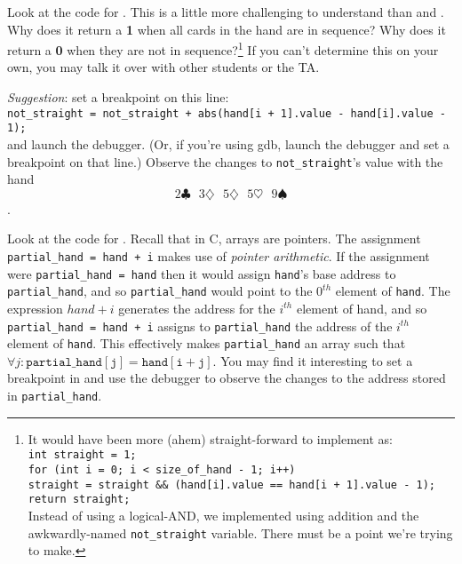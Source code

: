 Look at the code for .
This is a little more challenging to understand than  and .
Why does it return a \textbf{1} when all cards in the hand are in sequence?
Why does it return a \textbf{0} when they are not in sequence?\footnote{
    It would have been more (ahem) straight-forward to implement  as:
    \texttt{                                                                \\
    int straight = 1;                                                       \\
    for (int i = 0; i < size\_of\_hand - 1; i++)                            \\
        straight = straight \&\& (hand[i].value == hand[i + 1].value - 1);  \\
    return straight;                                                        \\
    }
    Instead of using a logical-AND, we implemented  using addition and the awkwardly-named \lstinline{not_straight} variable.
    There must be a point we're trying to make.
}
If you can't determine this on your own, you may talk it over with other students or the TA\@.

\textit{Suggestion}: set a breakpoint on this line: \\
\lstinline{not_straight = not_straight + abs(hand[i + 1].value - hand[i].value - 1);} \\
and launch the debugger.
(Or, if you're using gdb, launch the debugger and set a breakpoint on that line.)
Observe the changes to \lstinline{not_straight}'s value with the hand
\[2\clubsuit\ \ \ 3\diamondsuit\ \ \ 5\diamondsuit\ \ \ 5\heartsuit\ \ \ 9\spadesuit\].
\begin{description}
\end{description}

Look at the code for .
Recall that in C, arrays are pointers.
The assignment \lstinline{partial_hand = hand + i} makes use of \textit{pointer arithmetic}.
If the assignment were \lstinline{partial_hand = hand} then it would assign \lstinline{hand}'s base address to \lstinline{partial_hand}, and so \lstinline{partial_hand} would point to the $0^{th}$ element of \lstinline{hand}.
The expression $hand+i$ generates the address for the $i^{th}$ element of \lstinline{}{hand}, and so \lstinline{partial_hand = hand + i} assigns to \lstinline{partial_hand} the address of the $i^{th}$ element of \lstinline{hand}.
This effectively makes \lstinline{partial_hand} an array such that $\forall j : \mathtt{partial\_hand[j] = hand[i+j]}$.
You may find it interesting to set a breakpoint in  and use the debugger to observe the changes to the address stored in \lstinline{partial_hand}.

